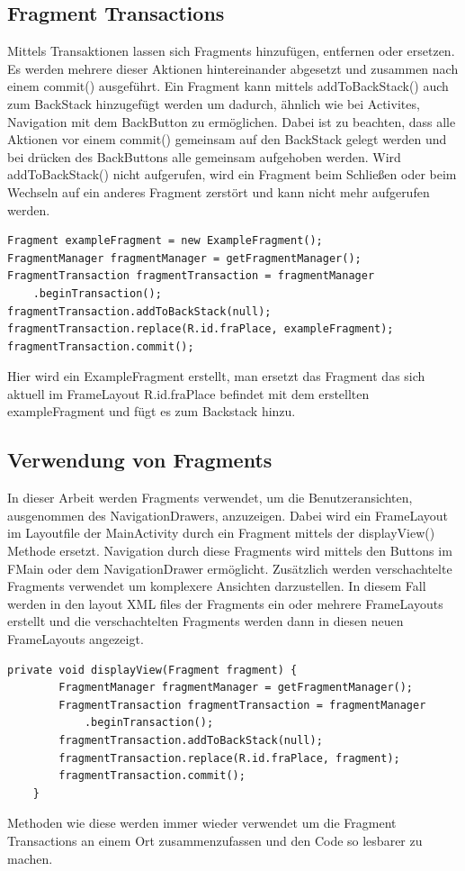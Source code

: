 \documentclass[FIPLY_base.tex]{subfiles}
\begin{document}
\subsection{Fragment Transactions}
Mittels Transaktionen lassen sich Fragments hinzufügen, entfernen oder ersetzen.
Es werden mehrere dieser Aktionen hintereinander abgesetzt und zusammen nach einem commit() ausgeführt.
Ein Fragment kann mittels addToBackStack() auch zum BackStack hinzugefügt werden um dadurch, ähnlich wie bei Activites, Navigation mit dem BackButton zu ermöglichen.
Dabei ist zu beachten, dass alle Aktionen vor einem commit() gemeinsam auf den BackStack gelegt werden und bei drücken des BackButtons alle gemeinsam aufgehoben werden.
Wird addToBackStack() nicht aufgerufen, wird ein Fragment beim Schließen oder beim Wechseln auf ein anderes Fragment zerstört und kann nicht mehr aufgerufen werden.

\begin{lstlisting}
Fragment exampleFragment = new ExampleFragment();
FragmentManager fragmentManager = getFragmentManager();
FragmentTransaction fragmentTransaction = fragmentManager
	.beginTransaction();
fragmentTransaction.addToBackStack(null);
fragmentTransaction.replace(R.id.fraPlace, exampleFragment);
fragmentTransaction.commit();
\end{lstlisting}
Hier wird ein ExampleFragment erstellt, man ersetzt das Fragment das sich aktuell im FrameLayout R.id.fraPlace befindet mit dem erstellten exampleFragment und fügt es zum Backstack hinzu.


\newpage
\subsection{Verwendung von Fragments}
In dieser Arbeit werden Fragments verwendet, um die Benutzeransichten, ausgenommen des NavigationDrawers, anzuzeigen.
Dabei wird ein FrameLayout im Layoutfile der MainActivity durch ein Fragment mittels der displayView() Methode ersetzt.
Navigation durch diese Fragments wird mittels den Buttons im FMain oder dem NavigationDrawer ermöglicht.
Zusätzlich werden verschachtelte Fragments verwendet um komplexere Ansichten darzustellen. In diesem Fall werden in den layout XML files der Fragments ein oder mehrere FrameLayouts erstellt und die verschachtelten Fragments werden dann in diesen neuen FrameLayouts angezeigt.
\ \\
\begin{lstlisting}
private void displayView(Fragment fragment) {
        FragmentManager fragmentManager = getFragmentManager();
        FragmentTransaction fragmentTransaction = fragmentManager
        	.beginTransaction();
        fragmentTransaction.addToBackStack(null);
        fragmentTransaction.replace(R.id.fraPlace, fragment);
        fragmentTransaction.commit();
    }
\end{lstlisting}
Methoden wie diese werden immer wieder verwendet um die Fragment Transactions an einem Ort zusammenzufassen und den Code so lesbarer zu machen.
\end{document}

